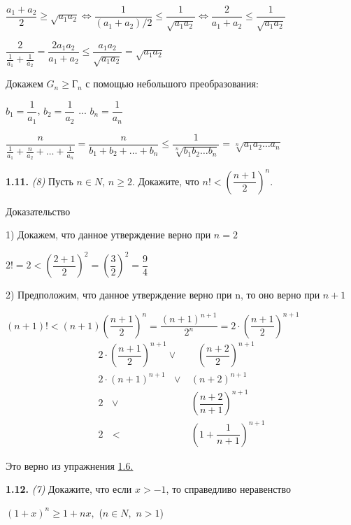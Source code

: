 \documentclass[12pt]{article}
\begin{document}
	\quad$\dfrac{a_1+a_2}{2}\ge \sqrt{a_1a_2}$\quad $\Longleftrightarrow$\quad $\dfrac{1}{(a_1+a_2)/2} \le \dfrac{1}{\sqrt{a_1a_2}}$\quad$\Longleftrightarrow$\quad$\dfrac{2}{a_1+a_2}\le \dfrac{1}{\sqrt{a_1a_2}}$
	
	\medskip
	
	\quad$
	\dfrac{2}{\frac{1}{a_1}+\frac{1}{a_2}} = \dfrac{2a_1a_2}{a_1+a_2} \le \dfrac{a_1a_2}{\sqrt{a_1a_2}} = \sqrt{a_1a_2}
	$
	\medskip
	
	Докажем $G_n\ge \text{Г}_n$ с помощью небольшого преобразования:\medskip
	
	$b_1=\dfrac{1}{a_1}$, $b_2=\dfrac{1}{a_2}$ ... $b_n=\dfrac{1}{a_n}$\medskip
	
	$\dfrac{n}{\frac{1}{a_1}+\frac{n}{a_2}+\dots+\frac{1}{a_n}} = \dfrac{n}{b_1+b_2+\dots+b_n} \le \dfrac{1}{\sqrt[n]{b_1b_2\dots b_n}} = \sqrt[n]{a_1a_2\dots a_n}$
	
	\medskip
	
	\medskip
	{\bf 1.11.} {\it(8)} Пусть $n\in N$, $n\ge 2$. Докажите, что $n! < \left(\dfrac{n+1}{2}\right)^n$.\vspace{2mm}
	
	Доказательство
	\medskip
	
	1) Докажем, что данное утверждение верно при $n=2$
	
	\quad$
		2! = 2 < \left(\dfrac{2+1}{2}\right)^2 = \left(\dfrac{3}{2}\right)^2 = \dfrac{9}{4}
	$\smallskip
	
	2) Предположим, что данное утверждение верно при n, то оно верно при $n+1$
	
	$
		(n+1)! < (n+1)\left(\dfrac{n+1}{2}\right)^n = \dfrac{(n+1)^{n+1}}{2^n} = 2\cdot\left(\dfrac{n+1}{2}\right)^{n+1}
	$
	\begin{eqnarray*}
		2\cdot\left(\dfrac{n+1}{2}\right)^{n+1} \vee& \text{ } \left(\dfrac{n+2}{2}\right)^{n+1}\\
		2\cdot(n+1)^{n+1}\text{ }  \vee& (n+2)^{n+1} \\
		2 \text{ } \vee& \left(\dfrac{n+2}{n+1}\right)^{n+1} \\
		2\text{ } <& \left(1+\dfrac{1}{n+1}\right)^{n+1}
	\end{eqnarray*}
	
	Это верно из упражнения \hyperref[1.6.]{1.6.}
	
	
	
	\medskip
	{\bf1.12.} {\it(7)} Докажите, что если $x>-1$, то справедливо неравенство
	
	\begin{center}
		$(1+x)^n\ge 1+nx,$ ($n\in N,$ $n>1$)
	\end{center}
	
\end{document}
